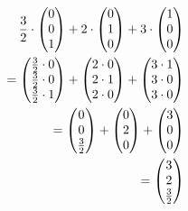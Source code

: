 \begin{align*}
    \frac{3}{2} \cdot \begin{pmatrix} 0 \\ 0 \\ 1 \end{pmatrix} + 2 \cdot \begin{pmatrix} 0 \\ 1 \\ 0 \end{pmatrix} + 3 \cdot \begin{pmatrix} 1 \\ 0 \\ 0 \end{pmatrix} \\
    =  \begin{pmatrix}
           \frac{3}{2} \cdot 0 \\ \frac{3}{2} \cdot 0 \\ \frac{3}{2} \cdot 1
       \end{pmatrix} + \begin{pmatrix}
                           2 \cdot 0 \\ 2 \cdot 1 \\ 2 \cdot 0
                       \end{pmatrix} + \begin{pmatrix}
                                           3 \cdot 1 \\ 3 \cdot 0 \\ 3 \cdot 0
                                       \end{pmatrix}                                                                                               \\\pagebreak[2]
    = \begin{pmatrix}
          0 \\ 0 \\ \frac{3}{2}
      \end{pmatrix} + \begin{pmatrix}
                          0 \\ 2 \\ 0
                      \end{pmatrix} + \begin{pmatrix}
                                          3 \\ 0 \\ 0
                                      \end{pmatrix}                                                                                                                    \\\pagebreak[2]
    = \begin{pmatrix}
          3 \\ 2 \\ \frac{3}{2}
      \end{pmatrix}
\end{align*}

